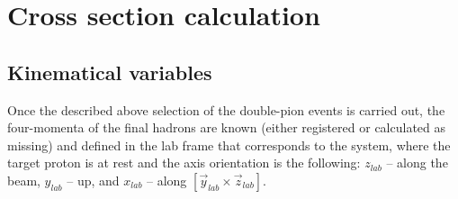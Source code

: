 \documentclass[prc,twocolumn,superscriptaddress,showpacs,amssymb,amsmath,amsfonts,linenumbers,aps]{revtex4-1}
\begin{document}






























\section{Cross section calculation}

\subsection{Kinematical variables}
\label{sec_kin_var}

Once the described above selection of the double-pion events is carried out, the four-momenta of the final hadrons are known (either registered or calculated as missing) and defined in the lab frame that corresponds to the system, where the target proton is at rest and the axis orientation is the following: $z_{lab}$ -- along the beam, $y_{lab}$ -- up, and $x_{lab}$ -- along $[\vec y_{lab} \times \vec z_{lab}]$.
\end{document}
